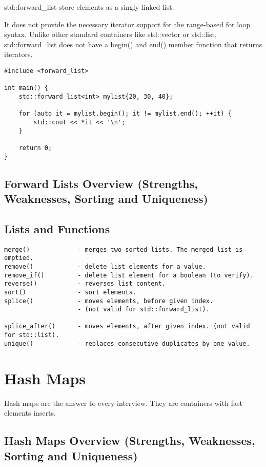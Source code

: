 \documentclass[openany]{report}
\begin{document}
std::forward\_list store elements as a singly linked list.

It does not provide the necessary iterator support for the range-based for loop syntax.
Unlike other standard containers like std::vector or std::list,
std::forward\_list does not have a begin() and end() member function that returns iterators.

\begin{verbatim}
#include <forward_list>

int main() {
    std::forward_list<int> mylist{20, 30, 40};

    for (auto it = mylist.begin(); it != mylist.end(); ++it) {
        std::cout << *it << '\n';
    }

    return 0;
}
\end{verbatim}

\subsection{Forward Lists Overview (Strengths, Weaknesses, Sorting and Uniqueness)}

\subsection{Lists and Functions}

\begin{verbatim}
merge()             - merges two sorted lists. The merged list is emptied.
remove()            - delete list elements for a value.
remove_if()         - delete list element for a boolean (to verify).
reverse()           - reverses list content.
sort()              - sort elements.
splice()            - moves elements, before given index.
                    - (not valid for std::forward_list).

splice_after()      - moves elements, after given index. (not valid for std::list).
unique()            - replaces consecutive duplicates by one value.
\end{verbatim}

\section{Hash Maps}

Hash maps are the answer to every interview. They are containers with fast elements inserts.

\subsection{Hash Maps Overview (Strengths, Weaknesses, Sorting and Uniqueness)}
\end{document}
